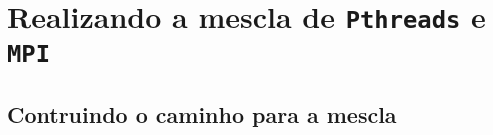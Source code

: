 \section{Realizando a mescla de \texttt{Pthreads} e \texttt{MPI}}
    
    \subsection{Contruindo o caminho para a mescla}